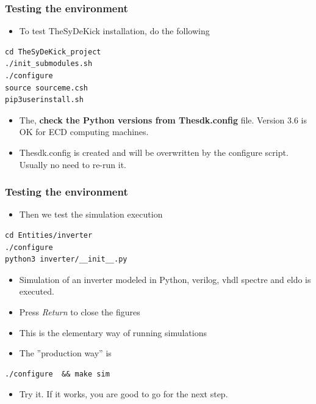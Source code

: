 \documentclass[logo=bluequo,normaltitle]{aaltoslides}
\begin{document}

\begin{frame}[t,fragile]
    \frametitle{Testing the environment} 
    \begin{itemize}
            \item To test TheSyDeKick installation, do the following
        \end{itemize}
\begin{lstlisting}
cd TheSyDeKick_project
./init_submodules.sh     
./configure              
source sourceme.csh           
pip3userinstall.sh   
\end{lstlisting}
\begin{itemize}
    \item The, \textbf{check the Python versions from Thesdk.config} file. Version 3.6 is OK
        for ECD computing machines.
    \item Thesdk.config is created and will be overwritten by the configure
        script. Usually no need to re-run it. 
\end{itemize}

\end{frame}

\begin{frame}[t,fragile]
    \frametitle{Testing the environment} 
    \begin{itemize}
            \item Then we test the simulation execution
        \end{itemize}
\begin{lstlisting}
cd Entities/inverter     
./configure              
python3 inverter/__init__.py  
\end{lstlisting}
\begin{itemize}
    \item Simulation of an inverter modeled in Python, verilog, vhdl spectre and eldo
        is executed.
    \item Press \emph{Return} to close the figures
    \item This is the elementary way of running simulations
    \item The ''production way'' is 
\end{itemize}
\begin{lstlisting}
./configure  && make sim          
\end{lstlisting}
\begin{itemize}
    \item Try it. If it works, you are good to go for the next step.
\end{itemize}
\end{frame}
\end{document}
